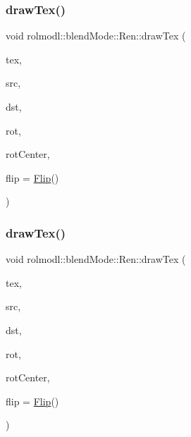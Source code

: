 \mbox{\label{classrolmodl_1_1blend_mode_1_1_ren_aefc656cae1724bd85a35555097b20d37}} 
\subsubsection{\texorpdfstring{drawTex()}{drawTex()}\hspace{0.1cm}{\footnotesize\ttfamily [34/36]}}
{\footnotesize\ttfamily void rolmodl\+::blend\+Mode\+::\+Ren\+::draw\+Tex (\begin{DoxyParamCaption}\item[{Tex \&}]{tex,  }\item[{const \mbox{\hyperlink{structrolmodl_1_1blend_mode_1_1_src_rect_w_h}{Src\+Rect\+WH}}}]{src,  }\item[{const \mbox{\hyperlink{structrolmodl_1_1blend_mode_1_1_dst_rect_x_y}{Dst\+Rect\+XY}}}]{dst,  }\item[{const double}]{rot,  }\item[{const \mbox{\hyperlink{structrolmodl_1_1geom_1_1_pos}{geom\+::\+Pos}}}]{rot\+Center,  }\item[{const \mbox{\hyperlink{structrolmodl_1_1blend_mode_1_1_flip}{Flip}}}]{flip = {\ttfamily \mbox{\hyperlink{structrolmodl_1_1blend_mode_1_1_flip}{Flip}}()} }\end{DoxyParamCaption})}

\mbox{\label{classrolmodl_1_1blend_mode_1_1_ren_a46ea13b005400ddae8dfc3ce4af10cdd}} 
\subsubsection{\texorpdfstring{drawTex()}{drawTex()}\hspace{0.1cm}{\footnotesize\ttfamily [35/36]}}
{\footnotesize\ttfamily void rolmodl\+::blend\+Mode\+::\+Ren\+::draw\+Tex (\begin{DoxyParamCaption}\item[{Tex \&}]{tex,  }\item[{const \mbox{\hyperlink{structrolmodl_1_1blend_mode_1_1_src_rect_x_y}{Src\+Rect\+XY}}}]{src,  }\item[{const \mbox{\hyperlink{structrolmodl_1_1blend_mode_1_1_dst_rect_w_h}{Dst\+Rect\+WH}}}]{dst,  }\item[{const double}]{rot,  }\item[{const \mbox{\hyperlink{structrolmodl_1_1geom_1_1_pos}{geom\+::\+Pos}}}]{rot\+Center,  }\item[{const \mbox{\hyperlink{structrolmodl_1_1blend_mode_1_1_flip}{Flip}}}]{flip = {\ttfamily \mbox{\hyperlink{structrolmodl_1_1blend_mode_1_1_flip}{Flip}}()} }\end{DoxyParamCaption})}

